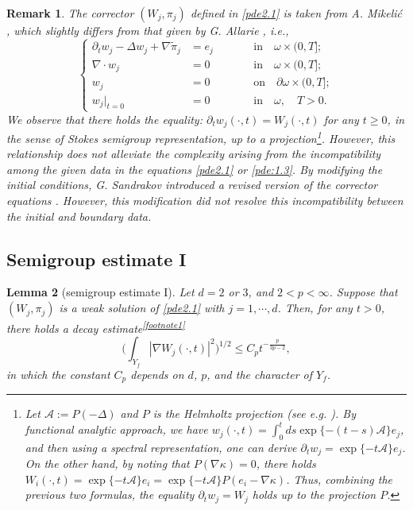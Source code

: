 \documentclass[13pt,CJK]{article}
\theoremstyle{plain}                       %
\newtheorem{lemma}{Lemma}[section]
\newtheorem{remark}[lemma]{Remark}
\theoremstyle{remark}
\numberwithin{equation}{section}
\begin{document}
\begin{remark}
\emph{The corrector $(W_j,\pi_j)$ defined in
\eqref{pde2.1} is taken from A. Mikeli\'c \cite{Mikelic94}, which slightly differs from
that given by G. Allarie \cite{Allaire92}, i.e.,
\begin{equation}\label{pde:1.3}
\left\{
\begin{aligned}
\partial_t w_j-\Delta w_{j}+\nabla
\tilde{\pi}_{j}&=e_j&\qquad&\text{in}\quad \omega\times(0,T];\\
\nabla\cdot w_j &=0&\qquad&\text{in}\quad
\omega\times(0,T];\\
w_j&=0&\qquad&\text{on}\quad\partial\omega\times(0,T];\\
w_j|_{t=0}&=0&\qquad&\text{in}\quad\omega,
\quad T>0.
\end{aligned}
\right.
\end{equation}
We observe that there holds the equality:
$\partial_t w_j(\cdot,t)=W_j(\cdot,t)$ for any $t\geq 0$,
in the sense of Stokes semigroup representation, up to a projection\footnote{
Let $\mathcal{A}:=P(-\Delta)$ and $P$ is the Helmholtz projection
(see e.g. \cite{Tsai18}). By functional analytic approach,
we have $w_j(\cdot,t)=\int_{0}^{t}ds\exp\{-(t-s)\mathcal{A}\}e_j$,
and then using a spectral
representation, one can derive $\partial_t w_j
= \exp\{-t\mathcal{A}\}e_j$. On the other hand, by noting that $P(\nabla\kappa) = 0$, there holds
$W_i(\cdot,t)=\exp\{-t\mathcal{A}\}e_i =
\exp\{-t\mathcal{A}\}P(e_i-\nabla \kappa)$.
Thus, combining the previous two formulas, the equality $\partial_t w_j = W_j$ holds
up to the projection $P$.}.
However, this relationship does not alleviate the complexity arising
from the incompatibility among the given data in the equations \eqref{pde2.1}
or \eqref{pde:1.3}. By modifying the initial conditions,
G. Sandrakov introduced a revised version of the corrector
equations \cite[Theorem 2]{Sandrakov97}. 
However, this modification did not resolve this incompatibility between the initial and boundary data.}
\end{remark}








\subsection{\centering Semigroup estimate I}\label{subsec:3.1}


\begin{lemma}[semigroup estimate I]\label{lemma3.3}
Let $d=2$ or $3$, and $2< p<\infty$.
Suppose that $(W_j,\pi_j)$ is a weak solution of \eqref{pde2.1}
with $j=1,\cdots,d$. Then, for any $t>0$,
there holds a decay estimate\textsuperscript{\ref{footnote1}}
\begin{equation}\label{pri:3.6}
\bigg(\int_{Y_f}|\nabla W_j(\cdot, t)|^2\bigg)^{1/2}
\leq C_p t^{-\frac{p}{3p-2}},
\end{equation}
in which the constant $C_p$ depends on $d$, $p$, and the character of
$Y_f$.
\end{lemma}
\end{document}
